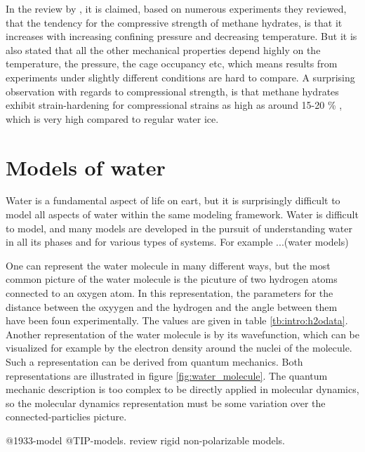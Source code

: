 In the review by \citet{Ning2012}, it is claimed, based on numerous experiments they reviewed, that the tendency for the compressive strength of methane hydrates, is that it increases with increasing confining pressure and decreasing temperature. But it is also stated that all the other mechanical properties depend highly on the temperature, the pressure, the cage occupancy etc, which means results from experiments under slightly different conditions are hard to compare. A surprising observation with regards to compressional strength, is that methane hydrates exhibit strain-hardening for compressional strains as high as around 15-20 \% \cite{Durham2003, Stern1998}, which is very high compared to regular water ice.

\section{Models of water}
Water is a fundamental aspect of life on eart, but it is surprisingly difficult to model all aspects of water within the same modeling framework. Water is difficult to model, and many models are developed in the pursuit of understanding water in all its phases and for various types of systems. For example ...(water models) 

One can represent the water molecule in many different ways, but the most common picture of the water molecule is the picuture of two hydrogen atoms connected to an oxygen atom. In this representation, the parameters for the distance between the oxyygen and the hydrogen and the angle between them have been foun experimentally. The values are given in table \ref{tb:intro:h2odata}. Another representation of the water molecule is by its wavefunction, which can be visualized for example by the electron density around the nuclei of the molecule. Such a representation can be derived from quantum mechanics. Both representations are illustrated in figure \ref{fig:water_molecule}. The quantum mechanic description is too complex to be directly applied in molecular dynamics, so the molecular dynamics representation must be some variation over the connected-particlies picture. 


@1933-model @TIP-models.  \citet{Vega2011} review rigid non-polarizable models.

